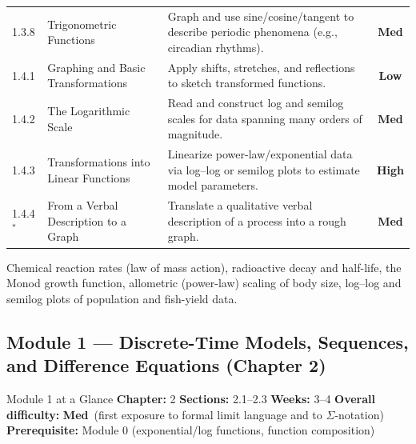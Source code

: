 \documentclass[11pt]{article}
\newcommand{\diffL}{\textcolor{diffgreenc}{\textbf{Low}}}
\newcommand{\diffM}{\textcolor{diffamberc}{\textbf{Med}}}
\newcommand{\diffH}{\textcolor{diffredc}{\textbf{High}}}
\newcommand{\opt}{$^{\ast}$}
\begin{document}
\begin{longtable}{P{1.6cm}P{4.6cm}P{7.3cm}c}
1.3.8 & Trigonometric Functions & Graph and use sine/cosine/tangent to describe periodic phenomena (e.g., circadian rhythms). & \diffM \\
1.4.1 & Graphing and Basic Transformations & Apply shifts, stretches, and reflections to sketch transformed functions. & \diffL \\
1.4.2 & The Logarithmic Scale & Read and construct log and semilog scales for data spanning many orders of magnitude. & \diffM \\
1.4.3 & Transformations into Linear Functions & Linearize power-law/exponential data via log--log or semilog plots to estimate model parameters. & \diffH \\
1.4.4\opt & From a Verbal Description to a Graph & Translate a qualitative verbal description of a process into a rough graph. & \diffM \\
\bottomrule
\end{longtable}

\begin{appbox}
Chemical reaction rates (law of mass action), radioactive decay and half-life, the Monod
growth function, allometric (power-law) scaling of body size, log--log and semilog plots of
population and fish-yield data.
\end{appbox}

\subsection*{Module 1 --- Discrete-Time Models, Sequences, and Difference Equations (Chapter 2)}

\begin{modulebox}{Module 1 at a Glance}{}
\textbf{Chapter:} 2 \quad\textbf{Sections:} 2.1--2.3 \quad\textbf{Weeks:} 3--4 \quad
\textbf{Overall difficulty:} \diffM\ (first exposure to formal limit language and to
$\Sigma$-notation) \quad\textbf{Prerequisite:} Module 0 (exponential/log functions, function
composition)
\end{modulebox}
\end{document}
